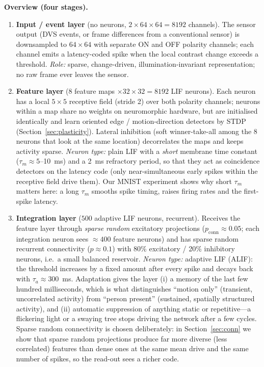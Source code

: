 \documentclass[11pt,a4paper]{article}
\begin{document}
\textbf{Overview (four stages).}
\begin{enumerate}
\item \textbf{Input / event layer} (no neurons, $2\times 64\times64 = 8192$ channels). The sensor output (DVS events, or frame differences from a conventional sensor) is downsampled to $64\times64$ with separate ON and OFF polarity channels; each channel emits a latency-coded spike when the local contrast change exceeds a threshold. \emph{Role:} sparse, change-driven, illumination-invariant representation; no raw frame ever leaves the sensor.
\item \textbf{Feature layer} ($8$ feature maps $\times 32\times32 = 8192$ LIF neurons). Each neuron has a local $5\times5$ receptive field (stride 2) over both polarity channels; neurons within a map share no weights on neuromorphic hardware, but are initialised identically and learn oriented edge / motion-direction detectors by STDP (Section~\ref{sec:plasticity}). Lateral inhibition (soft winner-take-all among the 8 neurons that look at the same location) decorrelates the maps and keeps activity sparse. \emph{Neuron type:} plain LIF with a \emph{short} membrane time constant ($\tau_m\approx 5$--10~ms) and a 2~ms refractory period, so that they act as coincidence detectors on the latency code (only near-simultaneous early spikes within the receptive field drive them). Our MNIST experiment shows why short $\tau_m$ matters here: a long $\tau_m$ smooths spike timing, raises firing rates and the first-spike latency.
\item \textbf{Integration layer} ($500$ adaptive LIF neurons, recurrent). Receives the feature layer through \emph{sparse random} excitatory projections ($p_{\mathrm{conn}}\approx 0.05$; each integration neuron sees $\approx 400$ feature neurons) and has sparse random recurrent connectivity ($p\approx0.1$) with 80\% excitatory / 20\% inhibitory neurons, i.e.\ a small balanced reservoir. \emph{Neuron type:} adaptive LIF (ALIF): the threshold increases by a fixed amount after every spike and decays back with $\tau_a\approx 300$~ms. Adaptation gives the layer (i) a memory of the last few hundred milliseconds, which is what distinguishes ``motion only'' (transient, uncorrelated activity) from ``person present'' (sustained, spatially structured activity), and (ii) automatic suppression of anything static or repetitive---a flickering light or a swaying tree stops driving the network after a few cycles. Sparse random connectivity is chosen deliberately: in Section~\ref{sec:conn} we show that sparse random projections produce far more diverse (less correlated) features than dense ones at the same mean drive and the same number of spikes, so the read-out sees a richer code.

\end{enumerate}
\end{document}

